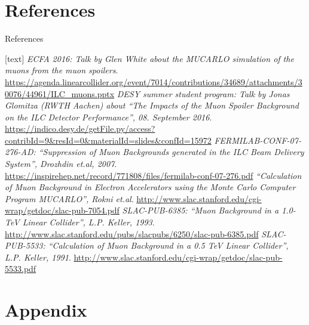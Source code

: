\documentclass[xcolor={dvipsnames}]{beamer}
\begin{document}
\section{References}
\begin{frame}{References}
\tiny
\begin{thebibliography}{9}
[text]
  \emph{ECFA 2016: Talk by Glen White about the MUCARLO simulation of the muons from the muon spoilers}. \url{https://agenda.linearcollider.org/event/7014/contributions/34689/attachments/30076/44961/ILC_muons.pptx}
  \emph{DESY summer student program: Talk by Jonas Glomitza (RWTH Aachen) about ``The Impacts of the Muon Spoiler Background on the ILC Detector Performance'', 08. September 2016}. \url{https://indico.desy.de/getFile.py/access?contribId=9&resId=0&materialId=slides&confId=15972}
  \emph{FERMILAB-CONF-07-276-AD: ``Suppression of Muon Backgrounds generated in the ILC Beam Delivery System'', Drozhdin et.al, 2007}. \url{https://inspirehep.net/record/771808/files/fermilab-conf-07-276.pdf}
  \emph{``Calculation of Muon Background in Electron Accelerators using the Monte Carlo Computer Program MUCARLO'', Rokni et.al}. \url{http://www.slac.stanford.edu/cgi-wrap/getdoc/slac-pub-7054.pdf}
  \emph{SLAC-PUB-6385: ``Muon Background in a 1.0-TeV Linear Collider'', L.P. Keller, 1993}. \url{http://www.slac.stanford.edu/pubs/slacpubs/6250/slac-pub-6385.pdf}
  \emph{SLAC-PUB-5533: ``Calculation of Muon Background in a 0.5 TeV Linear Collider'', L.P. Keller, 1991}. \url{http://www.slac.stanford.edu/cgi-wrap/getdoc/slac-pub-5533.pdf}
\end{thebibliography}
\end{frame}
\section*{Appendix}
\end{document}
